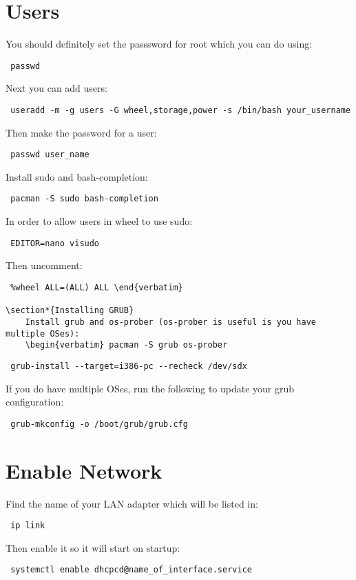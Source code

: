 \documentclass[12pt]{article}
\begin{document}
\section*{Users}
    You should definitely set the passsword for root which you can do using:
    \begin{verbatim} passwd \end{verbatim}
    Next you can add users:
    \begin{verbatim} useradd -m -g users -G wheel,storage,power -s /bin/bash your_username \end{verbatim}
    Then make the password for a user:
    \begin{verbatim} passwd user_name \end{verbatim}
    Install sudo and bash-completion:
    \begin{verbatim} pacman -S sudo bash-completion \end{verbatim}
    In order to allow users in wheel to use sudo:
    \begin{verbatim} EDITOR=nano visudo \end{verbatim}
    Then uncomment:
    \begin{verbatim} %wheel ALL=(ALL) ALL \end{verbatim}

\section*{Installing GRUB}
    Install grub and os-prober (os-prober is useful is you have multiple OSes):
    \begin{verbatim} pacman -S grub os-prober \end{verbatim}
    \begin{verbatim} grub-install --target=i386-pc --recheck /dev/sdx \end{verbatim}
    If you do have multiple OSes, run the following to update your grub
    configuration:
    \begin{verbatim} grub-mkconfig -o /boot/grub/grub.cfg \end{verbatim}

\section*{Enable Network}
    Find the name of your LAN adapter which will be listed in:
    \begin{verbatim} ip link \end{verbatim}
    Then enable it so it will start on startup:
    \begin{verbatim} systemctl enable dhcpcd@name_of_interface.service
    \end{verbatim}
\end{document}
